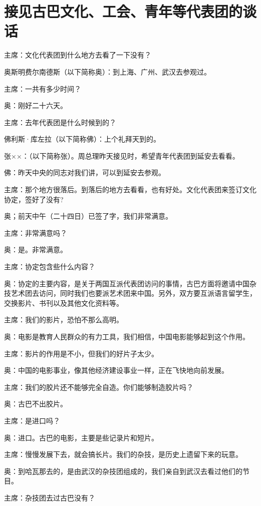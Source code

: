 \section[接见古巴文化、工会、青年等代表团的谈话（一九六三年七月二十六日）]{接见古巴文化、工会、青年等代表团的谈话}


主席：文化代表团到什么地方去看了一下没有？

奥斯明费尔南德斯（以下简称奥）：到上海、广州、武汉去参观过。

主席：一共有多少时间？

奥：刚好二十六天。

主席：去年代表团是什么时候到的？

佛利斯·库左拉（以下简称佛）：上个礼拜天到的。

张××：（以下简称张）。周总理昨天接见时，希望青年代表团到延安去看看。

佛：昨天中央的同志对我们讲，可以到延安去参观。

主席：那个地方很落后。到落后的地方去看看，也有好处。文化代表团来签订文化协定，签好了没有?

奥；前天中午（二十四日）已签了字，我们非常满意。

主席：非常满意吗？

奥：是。非常满意。

主席：协定包含些什么内容？

奥：协定的主要内容，是关于两国互派代表团访问的事情，古巴方面将邀请中国杂技艺术团去访问，同时我们也要派艺术团来中国。另外，双方要互派语言留学生，交换影片、书刊以及其他文化资料等。

主席：我们的影片，恐怕不那么高明。

奥：电影是教育人民群众的有力工具，我们相信，中国电影能够起到这个作用。

主席：影片的作用是不小，但我们的好片子太少。

奥：中国的电影事业，像其他经济建设事业一样，正在飞快地向前发展。

主席：我们的胶片还不能够完全自造。你们能够制造胶片吗？

奥：古巴不出胶片。

主席：是进口吗？

奥：进口。古巴的电影，主要是些记录片和短片。

主席：慢慢发展下去，就会搞长片。我们的杂技，是历史上遗留下来的玩意。

奥：到哈瓦那去的，是由武汉的杂技团组成的，我们亲自到武汉去看过他们的节目。

主席：杂技团去过古巴没有？

